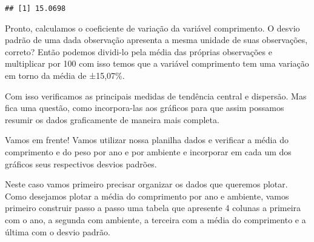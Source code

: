 \documentclass[]{book}
\begin{document}
\begin{verbatim}
## [1] 15.0698
\end{verbatim}

Pronto, calculamos o coeficiente de variação da variável comprimento. O desvio padrão de uma dada observação apresenta a mesma unidade de suas observações, correto? Então podemos dividi-lo pela média das próprias observações e multiplicar por 100 com isso temos que a variável comprimento tem uma variação em torno da média de ±15,07\%.

Com isso verificamos as principais medidas de tendência central e dispersão. Mas fica uma questão, como incorpora-las aos gráficos para que assim possamos resumir os dados graficamente de maneira mais completa.

Vamos em frente! Vamos utilizar nossa planilha dados e verificar a média do comprimento e do peso por ano e por ambiente e incorporar em cada um dos gráficos seus respectivos desvios padrões.

Neste caso vamos primeiro precisar organizar os dados que queremos plotar. Como desejamos plotar a média do comprimento por ano e ambiente, vamos primeiro construir passo a passo uma tabela que apresente 4 colunas a primeira com o ano, a segunda com ambiente, a terceira com a média do comprimento e a última com o desvio padrão.
\end{document}
